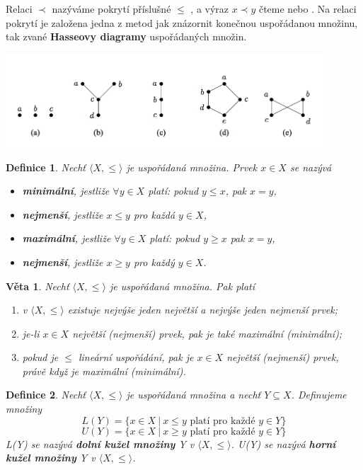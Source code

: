 \documentclass[12pt,a4paper]{article}
\newtheorem{definition}{Definice}
\newtheorem{sentence}{Věta}
\begin{document}
Relaci $\prec$ nazýváme pokrytí příslušné $\leq$ , a výraz $x \prec y$ čteme  nebo . Na relaci pokrytí je založena jedna z metod jak znázornit konečnou uspořádanou množinu, tak zvané \textbf{Hasseovy diagramy} uspořádaných množin.

\begin{center}
	\includegraphics[width=12cm]{img/HasseDiagrams}
\end{center}

\begin{definition}
	Nechť $\langle X, \leq \rangle$ je uspořádaná množina. Prvek $x \in X$ se nazývá
	\begin{itemize}
		\item \textbf{minimální}, jestliže $\forall y \in X$ platí: pokud $y \leq x$, pak $x = y$,
		\item \textbf{nejmenší}, jestliže $x \leq y$ pro každá $y \in X$,
		\item \textbf{maximální}, jestliže $\forall y \in X$ platí: pokud $y \geq x$ pak $x = y$,
		\item \textbf{nejmenší}, jestliže $x \geq y$ pro každý $y \in X$.
	\end{itemize}
\end{definition}

\begin{sentence}
	Nechť $\langle X, \leq \rangle$ je uspořádaná množina. Pak platí
	\begin{enumerate}
		\item v $\langle X, \leq \rangle$ existuje nejvýše jeden největší a nejvýše jeden nejmenší prvek;
		\item je-li $x \in X$ největší (nejmenší) prvek, pak je také maximální (minimální);
		\item pokud je $\leq$ lineární uspořádání, pak je $x \in X$ největší (nejmenší) prvek, právě když je maximální (minimální).
	\end{enumerate}
\end{sentence}

\begin{definition}
	Nechť $\langle X, \leq \rangle$ je uspořádaná množina a nechť $Y \subseteq X$. Definujeme množiny
	$$L(Y) = \{ x \in X \ | \ x \leq y \text{ platí pro každé } y \in Y\}$$
	$$U(Y) =  \{ x \in X \ | \ x \geq y \text{ platí pro každé } y \in Y\}$$
	L(Y) se nazývá \textbf{dolní kužel množiny} Y v  $\langle X, \leq \rangle$. U(Y) se nazývá \textbf{horní kužel množiny} Y v  $\langle X, \leq \rangle$.
\end{definition}
\end{document}
